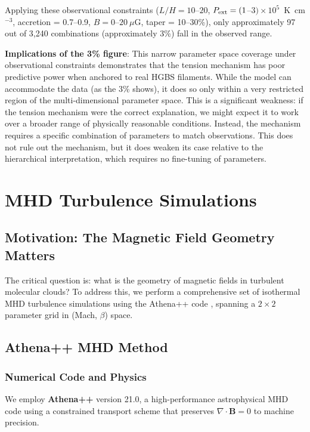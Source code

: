 \documentclass[11pt,a4paper]{article}
\begin{document}
Applying these observational constraints ($L/H = 10$--$20$, $P_{\rm ext} = (1$--$3) \times 10^5$~K~cm$^{-3}$, accretion = 0.7--0.9, $B = 0$--$20~\mu$G, taper = 10--30\%), only approximately 97 out of 3,240 combinations (approximately 3\%) fall in the observed range.

\textbf{Implications of the 3\% figure}: This narrow parameter space coverage under observational constraints demonstrates that the tension mechanism has poor predictive power when anchored to real HGBS filaments. While the model can accommodate the data (as the 3\% shows), it does so only within a very restricted region of the multi-dimensional parameter space. This is a significant weakness: if the tension mechanism were the correct explanation, we might expect it to work over a broader range of physically reasonable conditions. Instead, the mechanism requires a specific combination of parameters to match observations. This does not rule out the mechanism, but it does weaken its case relative to the hierarchical interpretation, which requires no fine-tuning of parameters.

\section{MHD Turbulence Simulations}
\label{sec:mhd}

\subsection{Motivation: The Magnetic Field Geometry Matters}

The critical question is: what is the geometry of magnetic fields in turbulent molecular clouds? To address this, we perform a comprehensive set of isothermal MHD turbulence simulations using the Athena++ code \citep{Stone2020}, spanning a $2\times2$ parameter grid in (Mach, $\beta$) space.

\subsection{Athena++ MHD Method}

\subsubsection{Numerical Code and Physics}

We employ \textbf{Athena++} version 21.0, a high-performance astrophysical MHD code using a constrained transport scheme that preserves $\nabla \cdot \mathbf{B} = 0$ to machine precision.
\end{document}
